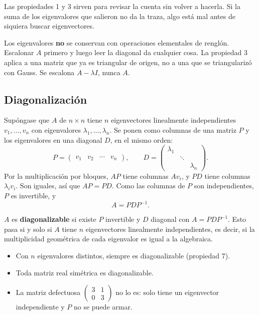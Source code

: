 \documentclass[11pt,letterpaper]{article}
\begin{document}
\begin{idea}
    Las propiedades 1 y 3 sirven para revisar la cuenta sin volver a
    hacerla. Si la suma de los eigenvalores que salieron no da la
    traza, algo está mal antes de siquiera buscar eigenvectores.
\end{idea}

\begin{ojo}
    Los eigenvalores \textbf{no} se conservan con operaciones
    elementales de renglón. Escalonar $A$ primero y luego leer la
    diagonal da cualquier cosa. La propiedad 3 aplica a una matriz
    que ya es triangular de origen, no a una que se triangularizó con
    Gauss. Se escalona $A - \lambda I$, nunca $A$.
\end{ojo}


\subsection*{Diagonalización}

Supóngase que $A$ de $n \times n$ tiene $n$ eigenvectores linealmente
independientes $v_1, \ldots, v_n$ con eigenvalores
$\lambda_1, \ldots, \lambda_n$. Se ponen como columnas de una matriz
$P$ y los eigenvalores en una diagonal $D$, en el mismo orden:
\[
    P = \begin{pmatrix} v_1 & v_2 & \cdots & v_n \end{pmatrix} ,
    \qquad
    D = \begin{pmatrix} \lambda_1 & & \\ & \ddots & \\
                        & & \lambda_n \end{pmatrix} .
\]
Por la multiplicación por bloques, $AP$ tiene columnas $Av_i$, y
$PD$ tiene columnas $\lambda_i v_i$. Son iguales, así que $AP = PD$.
Como las columnas de $P$ son independientes, $P$ es invertible, y
\[
    A = P D P^{-1} .
\]

\begin{definicion}
    $A$ es \textbf{diagonalizable} si existe $P$ invertible y $D$
    diagonal con $A = PDP^{-1}$. Esto pasa si y solo si $A$ tiene $n$
    eigenvectores linealmente independientes, es decir, si la
    multiplicidad geométrica de cada eigenvalor es igual a la
    algebraica.
\end{definicion}

\begin{itemize}[itemsep=0.2em]
    \item Con $n$ eigenvalores distintos, siempre es diagonalizable
          (propiedad 7).
    \item Toda matriz real simétrica es diagonalizable.
    \item La matriz defectuosa $\left(\begin{smallmatrix} 3 & 1 \\
          0 & 3 \end{smallmatrix}\right)$ no lo es: solo tiene un
          eigenvector independiente y $P$ no se puede armar.
\end{itemize}
\end{document}
